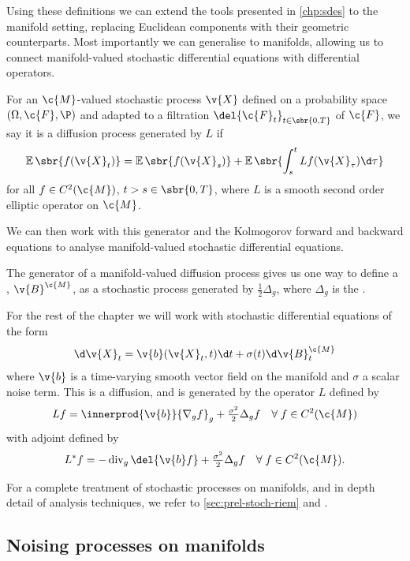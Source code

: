 Using these definitions we can extend the tools presented in \cref{chp:sdes} to the manifold setting, replacing Euclidean components with their geometric counterparts.
Most importantly we can generalise  to manifolds, allowing us to connect manifold-valued stochastic differential equations with differential operators.
\begin{definition}
	For an \(\c{M}\)-valued stochastic process \(\v{X}\) defined on a probability space \((\Omega, \c{F}, \P)\) and adapted to a filtration \(\del{\c{F}_t}_{t\in\sbr{0, T}}\) of \(\c{F}\), we say it is a diffusion process generated by \(L\) if
	\[
		\E\sbr{f(\v{X}_t)} = \E\sbr{f(\v{X}_s)} + \E\sbr{\int_s^t Lf(\v{X}_\tau) \d \tau}
	\]
	for all \(f\in C^2(\c{M})\), \(t > s \in \sbr{0, T}\), where \(L\) is a smooth second order elliptic operator on \(\c{M}\).
\end{definition}
We can then work with this generator and the Kolmogorov forward and backward equations to analyse manifold-valued stochastic differential equations.

The generator of a manifold-valued diffusion process gives us one way to define a , \(\v{B}^{\c{M}}\), as a stochastic process generated by \(\tfrac{1}{2}\Delta_g\), where \(\Delta_g\) is the  \cite[chapter 3]{hsu2002stochastic}.

For the rest of the chapter we will work with stochastic differential equations of the form
\[\d\v{X}_t = \v{b}(\v{X}_t, t) \d t + \sigma(t) \d \v{B}_t^{\c{M}}\]
where \(\v{b}\) is a time-varying smooth vector field on the manifold and \(\sigma\) a scalar noise term.
This is a diffusion, and is generated by the operator \(L\) defined by
\[Lf = \innerprod{\v{b}}{\nabla_g f}_g + \tfrac{\sigma^2}{2}\Delta_g f \quad \forall\;f\in C^2(\c{M})\]
with adjoint defined by
\[L^*f = -\dive_g \del{\v{b} f} + \tfrac{\sigma^2}{2}\Delta_g f\quad \forall\;f\in C^2(\c{M}).\]

For a complete treatment of stochastic processes on manifolds, and in depth detail of analysis techniques, we refer to \cref{sec:prel-stoch-riem} and \textcite{hsu2002stochastic}.

\subsection{Noising processes on manifolds}

